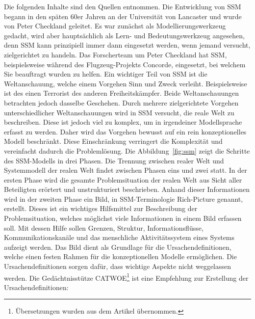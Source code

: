 \documentclass[11pt,a4paper]{report}
\begin{document}
Die folgenden Inhalte sind den Quellen \cite{checkland, bobwill, ssmger} entnommen. Die Entwicklung von SSM begann in den späten 60er Jahren an der Universität von Lancaster und wurde von Peter Checkland geleitet. Es war zunächst als Modellierungswerkzeug gedacht, wird aber hauptsächlich als Lern- und Bedeutungswerkzeug angesehen, denn SSM kann prinzipiell immer dann eingesetzt werden, wenn jemand versucht, zielgerichtet zu handeln. Das Forscherteam um Peter Checkland hat SSM, beispielsweise während des Flugzeug-Projekts Concorde, eingesetzt, bei welchem Sie beauftragt wurden zu helfen. Ein wichtiger Teil von SSM ist die Weltanschauung, welche einem Vorgehen Sinn und Zweck verleiht. Beispielsweise ist des einen Terrorist des anderen Freiheitskämpfer. Beide Weltanschauungen betrachten jedoch dasselbe Geschehen.  Durch mehrere zielgerichtete Vorgehen unterschiedlicher Weltanschauungen wird in SSM versucht, die reale Welt zu beschreiben. Diese ist jedoch viel zu komplex, um in irgendeiner Modellsprache erfasst zu werden. Daher wird das Vorgehen bewusst auf ein rein konzeptionelles Modell beschränkt. Diese Einschränkung verringert die Komplexität und vereinfacht dadurch die Problemlösung. Die Abbildung~\ref{fig:ssm} zeigt die Schritte des SSM-Modells in drei Phasen. Die Trennung zwischen realer Welt und Systemmodell der realen Welt findet zwischen Phasen eins und zwei statt. In der ersten Phase wird die gesamte Problemsituation der realen Welt aus Sicht aller Beteiligten erörtert und unstrukturiert beschrieben. Anhand dieser Informationen wird in der zweiten Phase ein Bild, in SSM-Terminologie Rich-Picture genannt, erstellt. Dieses ist ein wichtiges Hilfsmittel zur Beschreibung der Problemsituation, welches möglichst viele Informationen in einem Bild erfassen soll. Mit dessen Hilfe sollen Grenzen, Struktur, Informationsflüsse, Kommunikationskanäle und das menschliche Aktivitätssystem eines Systems aufzeigt werden. Das Bild dient als Grundlage für die Ursachendefinitionen, welche einen festen Rahmen für die konzeptionellen Modelle ermöglichen. Die Ursachendefinitionen sorgen dafür, dass wichtige Aspekte nicht weggelassen werden. Die Gedächtnisstütze CATWOE\footnote{Übersetzungen wurden aus dem Artikel \cite{ssmger} übernommen.} ist eine Empfehlung zur Erstellung der Ursachendefinitionen:
\end{document}
